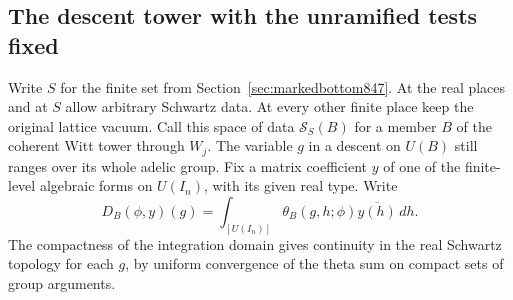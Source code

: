 \documentclass[a4paper,11pt]{article}
\theoremstyle{definition}
\theoremstyle{remark}
\numberwithin{equation}{section}
\begin{document}
\subsection{The descent tower with the unramified tests fixed}
\label{sec:restrictedtower848}
Write \(S\) for the finite set from Section~\ref{sec:markedbottom847}.
At the real places and at \(S\) allow arbitrary Schwartz data.
At every other finite place keep the original lattice vacuum.
Call this space of data \(\mathcal S_S(B)\) for a member \(B\)
of the coherent Witt tower through \(W_j\). The variable \(g\)
in a descent on \(U(B)\) still ranges over its whole adelic
group. Fix a matrix coefficient \(y\) of one of the finite-level
algebraic forms on \(U(I_n)\), with its given real type. Write
\[
        D_B(\phi,y)(g)
        =\int_{[U(I_n)]}\theta_B(g,h;\phi)\overline{y(h)}\,dh .
\]
The compactness of the integration domain gives continuity in
the real Schwartz topology for each \(g\), by uniform convergence
of the theta sum on compact sets of group arguments.
\end{document}
